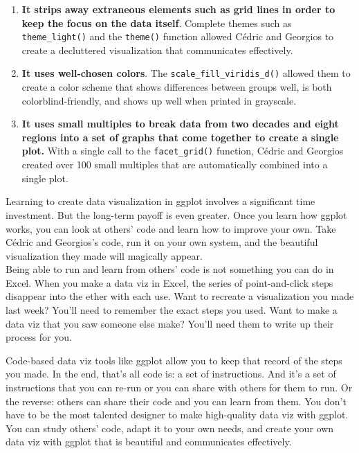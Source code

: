 \documentclass[
]{book}
\providecommand{\tightlist}{%
  \setlength{\itemsep}{0pt}\setlength{\parskip}{0pt}}
\begin{document}
\begin{enumerate}
\def\labelenumi{\arabic{enumi}.}
\tightlist
\item
  \textbf{It strips away extraneous elements such as grid lines in order to keep the focus on the data itself}. Complete themes such as \texttt{theme\_light()} and the \texttt{theme()} function allowed Cédric and Georgios to create a decluttered visualization that communicates effectively.
\item
  \textbf{It uses well-chosen colors}. The \texttt{scale\_fill\_viridis\_d()} allowed them to create a color scheme that shows differences between groups well, is both colorblind-friendly, and shows up well when printed in grayscale.
\item
  \textbf{It uses small multiples to break data from two decades and eight regions into a set of graphs that come together to create a single plot.} With a single call to the \texttt{facet\_grid()} function, Cédric and Georgios created over 100 small multiples that are automatically combined into a single plot.
\end{enumerate}

Learning to create data visualization in ggplot involves a significant time investment. But the long-term payoff is even greater. Once you learn how ggplot works, you can look at others' code and learn how to improve your own. Take Cédric and Georgios's code, run it on your own system, and the beautiful visualization they made will magically appear.\\
Being able to run and learn from others' code is not something you can do in Excel. When you make a data viz in Excel, the series of point-and-click steps disappear into the ether with each use. Want to recreate a visualization you made last week? You'll need to remember the exact steps you used. Want to make a data viz that you saw someone else make? You'll need them to write up their process for you.

Code-based data viz tools like ggplot allow you to keep that record of the steps you made. In the end, that's all code is: a set of instructions. And it's a set of instructions that you can re-run or you can share with others for them to run. Or the reverse: others can share their code and you can learn from them. You don't have to be the most talented designer to make high-quality data viz with ggplot. You can study others' code, adapt it to your own needs, and create your own data viz with ggplot that is beautiful and communicates effectively.
\end{document}
